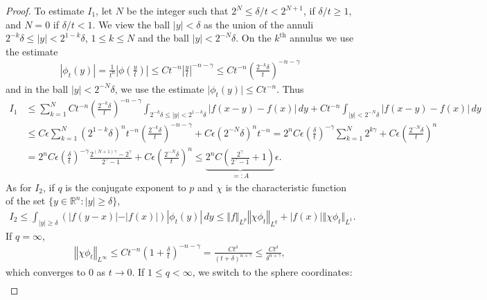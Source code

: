\documentclass{article}
\numberwithin{equation}{section}
\newcommand{\bbR}{\mathbb{R}}
\theoremstyle{plain}
\theoremstyle{definition}
\begin{document}
\begin{proof}
To estimate $I_1$, let $N$ be the integer such that $2^N\leq\delta/t<2^{N+1}$, if $\delta/t\geq 1$, and $N=0$ if $\delta/t<1$. We view the ball $\vert y\vert<\delta$ as the union of the annuli $2^{-k}\delta\leq\vert y\vert< 2^{1-k}\delta$, $1\leq k\leq N$ and the ball $\vert y\vert<2^{-N}\delta$. On the $k^\text{th}$ annulus we use the estimate
\begin{align*}
	\left\vert\phi_t(y)\right\vert=\frac{1}{t^n}\left\vert\phi\left(\frac{y}{t}\right)\right\vert\leq Ct^{-n}\left\vert\frac{y}{t}\right\vert^{-n-\gamma}\leq Ct^{-n}\left(\frac{2^{-k}\delta}{t}\right)^{-n-\gamma}
\end{align*}
and in the ball $\vert y\vert<2^{-N}\delta$, we use the estimate $\vert\phi_t(y)\vert\leq Ct^{-n}$. Thus
\begin{align*}
	I_1&\leq\sum_{k=1}^NCt^{-n}\left(\frac{2^{-k}\delta}{t}\right)^{-n-\gamma}\int_{2^{-k}\delta\leq\vert y\vert<2^{1-k}\delta}\vert f(x-y)-f(x)\vert\,dy +Ct^{-n}\int_{\vert y\vert<2^{-N}\delta}\vert f(x-y)-f(x)\vert\,dy\\
	&\leq C\epsilon\sum_{k=1}^N(2^{1-k}\delta)^n t^{-n}\left(\frac{2^{-k}\delta}{t}\right)^{-n-\gamma}+C\epsilon(2^{-N}\delta)^n t^{-n}= 2^nC\epsilon\left(\frac{\delta}{t}\right)^{-\gamma} \sum_{k=1}^N 2^{k\gamma}+C\epsilon\left(\frac{2^{-N}\delta}{t}\right)^n\\
	&=2^nC\epsilon\left(\frac{\delta}{t}\right)^{-\gamma}\frac{2^{(N+1)\gamma}-2^\gamma}{2^\gamma-1}+C\epsilon\left(\frac{2^{-N}\delta}{t}\right)^n\leq  \underbrace{2^nC\left(\frac{2^\gamma}{2^\gamma-1}+1\right)}_{=:A}\epsilon.
\end{align*}
As for $I_2$, if $q$ is the conjugate exponent to $p$ and $\chi$ is the characteristic function of the set $\{y\in\bbR^n:\vert y\vert\geq\delta\}$,
\begin{align*}
	I_2\leq\int_{\vert y\vert\geq\delta}\left(\vert f(y-x)\vert-\vert f(x)\vert\right)\left\vert\phi_t(y)\right\vert\,dy\leq\Vert f\Vert_{L^p}\left\Vert\chi\phi_t\right\Vert_{L^q}+\left\vert f(x)\right\vert\Vert\chi\phi_t\Vert_{L^1}.
\end{align*}
If $q=\infty$, 
\begin{align*}
	\left\Vert\chi\phi_t\right\Vert_{L^\infty}\leq Ct^{-n}\left(1+\frac{\delta}{t}\right)^{-n-\gamma}=\frac{Ct^\delta}{(t+\delta)^{n+\gamma}}\leq\frac{Ct^\delta}{\delta^{n+\gamma}},
\end{align*}
which converges to $0$ as $t\to 0$. If $1\leq q<\infty$, we switch to the sphere coordinates:
\begin{align*}

\end{align*}
\end{proof}
\end{document}

